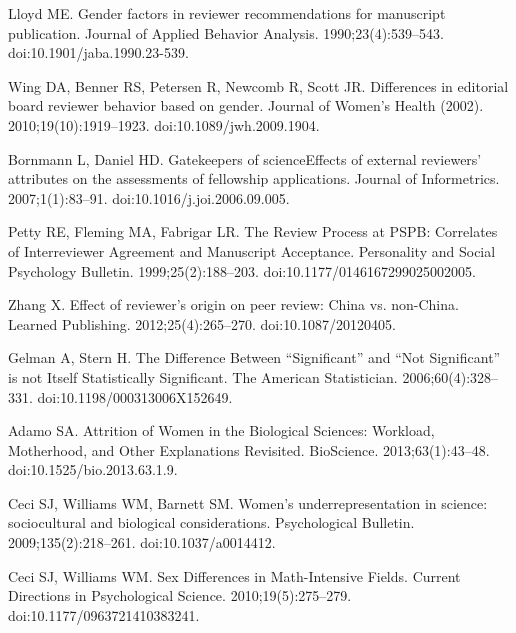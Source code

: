 \documentclass[10pt,letterpaper]{article}
\begin{document}
\begin{thebibliography}{100}
Lloyd ME.
\newblock Gender factors in reviewer recommendations for manuscript
  publication.
\newblock Journal of Applied Behavior Analysis. 1990;23(4):539--543.
\newblock doi:{10.1901/jaba.1990.23-539}.

Wing DA, Benner RS, Petersen R, Newcomb R, Scott JR.
\newblock Differences in editorial board reviewer behavior based on gender.
\newblock Journal of Women's Health (2002). 2010;19(10):1919--1923.
\newblock doi:{10.1089/jwh.2009.1904}.

Bornmann L, Daniel HD.
\newblock Gatekeepers of science{\textemdash}{Effects} of external
  reviewers{\textquoteright} attributes on the assessments of fellowship
  applications.
\newblock Journal of Informetrics. 2007;1(1):83--91.
\newblock doi:{10.1016/j.joi.2006.09.005}.

Petty RE, Fleming MA, Fabrigar LR.
\newblock The {Review} {Process} at {PSPB}: {Correlates} of {Interreviewer}
  {Agreement} and {Manuscript} {Acceptance}.
\newblock Personality and Social Psychology Bulletin. 1999;25(2):188--203.
\newblock doi:{10.1177/0146167299025002005}.

Zhang X.
\newblock Effect of reviewer's origin on peer review: {China} vs. non-{China}.
\newblock Learned Publishing. 2012;25(4):265--270.
\newblock doi:{10.1087/20120405}.

Gelman A, Stern H.
\newblock The {Difference} {Between}
  {\textquotedblleft}{Significant}{\textquotedblright} and
  {\textquotedblleft}{Not} {Significant}{\textquotedblright} is not {Itself}
  {Statistically} {Significant}.
\newblock The American Statistician. 2006;60(4):328--331.
\newblock doi:{10.1198/000313006X152649}.

Adamo SA.
\newblock Attrition of {Women} in the {Biological} {Sciences}: {Workload},
  {Motherhood}, and {Other} {Explanations} {Revisited}.
\newblock BioScience. 2013;63(1):43--48.
\newblock doi:{10.1525/bio.2013.63.1.9}.

Ceci SJ, Williams WM, Barnett SM.
\newblock Women's underrepresentation in science: sociocultural and biological
  considerations.
\newblock Psychological Bulletin. 2009;135(2):218--261.
\newblock doi:{10.1037/a0014412}.

Ceci SJ, Williams WM.
\newblock Sex {Differences} in {Math}-{Intensive} {Fields}.
\newblock Current Directions in Psychological Science. 2010;19(5):275--279.
\newblock doi:{10.1177/0963721410383241}.


\end{thebibliography}
\end{document}
